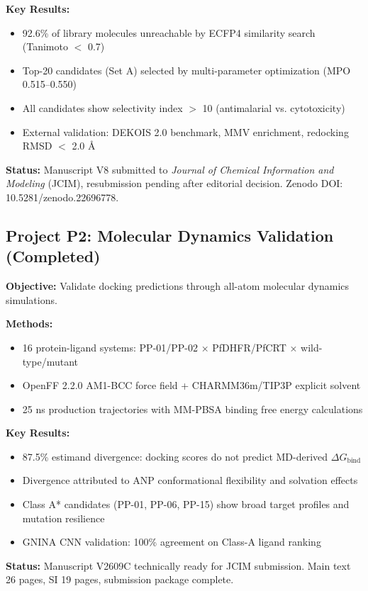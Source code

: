 \documentclass[11pt,a4paper]{article}
\begin{document}
\textbf{Key Results:}
\begin{itemize}
    \item 92.6\% of library molecules unreachable by ECFP4 similarity search (Tanimoto $<$ 0.7)
    \item Top-20 candidates (Set A) selected by multi-parameter optimization (MPO 0.515--0.550)
    \item All candidates show selectivity index $>$ 10 (antimalarial vs. cytotoxicity)
    \item External validation: DEKOIS 2.0 benchmark, MMV enrichment, redocking RMSD $<$ 2.0 Å
\end{itemize}

\textbf{Status:} Manuscript V8 submitted to \textit{Journal of Chemical Information and Modeling} (JCIM), resubmission pending after editorial decision. Zenodo DOI: 10.5281/zenodo.22696778.

\subsection{Project P2: Molecular Dynamics Validation (Completed)}

\textbf{Objective:} Validate docking predictions through all-atom molecular dynamics simulations.

\textbf{Methods:}
\begin{itemize}
    \item 16 protein-ligand systems: PP-01/PP-02 × PfDHFR/PfCRT × wild-type/mutant
    \item OpenFF 2.2.0 AM1-BCC force field + CHARMM36m/TIP3P explicit solvent
    \item 25 ns production trajectories with MM-PBSA binding free energy calculations
\end{itemize}

\textbf{Key Results:}
\begin{itemize}
    \item 87.5\% estimand divergence: docking scores do not predict MD-derived $\Delta G_{\text{bind}}$
    \item Divergence attributed to ANP conformational flexibility and solvation effects
    \item Class A* candidates (PP-01, PP-06, PP-15) show broad target profiles and mutation resilience
    \item GNINA CNN validation: 100\% agreement on Class-A ligand ranking
\end{itemize}

\textbf{Status:} Manuscript V2609C technically ready for JCIM submission. Main text 26 pages, SI 19 pages, submission package complete.
\end{document}
